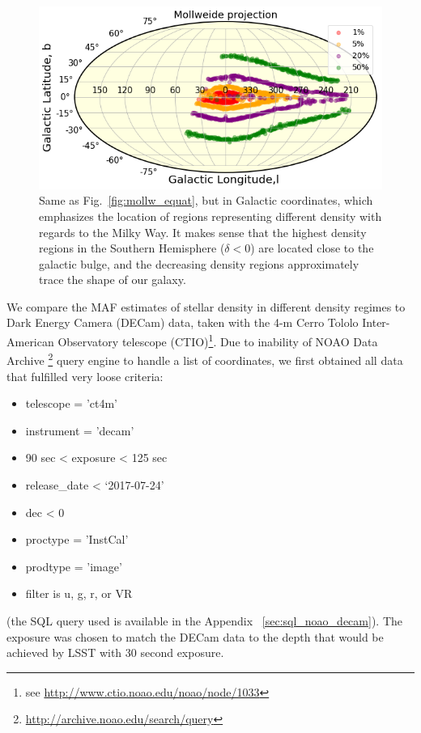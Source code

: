 \documentclass[DM,lsstdraft,toc,usenatbib]{lsstdoc}
\begin{document}
\begin{figure}
\includegraphics[width=1.0\columnwidth]{figs/Illustrate_density_regions_mollw_galactic.png}
\caption{Same as Fig.~\ref{fig:mollw_equat}, but in Galactic coordinates, which emphasizes the location of regions representing different density with regards to the Milky Way. It makes sense that the highest density regions in the Southern Hemisphere ($\delta < 0$) are located close to the galactic bulge, and the decreasing density regions approximately trace the shape of our galaxy.}
\label{fig:mollw_galactic}
\end{figure} 


We compare the MAF estimates of stellar density in different density regimes to Dark Energy Camera (DECam)  data, taken with the 4-m Cerro Tololo Inter-American Observatory telescope (CTIO)\footnote{see \url{http://www.ctio.noao.edu/noao/node/1033}}. Due to inability of NOAO Data Archive \footnote{\url{http://archive.noao.edu/search/query}} query engine to handle a list of coordinates, we  first obtained all data that fulfilled very loose criteria:
\begin{itemize}
\item telescope = 'ct4m'
\item instrument = 'decam'
\item 90 sec < exposure < 125 sec 
\item release\_date < ‘2017-07-24'
\item dec < 0 
\item proctype = 'InstCal' 
\item prodtype = 'image'
\item filter is  u, g, r,  or VR 
\end{itemize}
(the SQL query used is available in the Appendix ~\ref{sec:sql_noao_decam}). 
The exposure was chosen to match the DECam data to the depth that would be achieved by LSST with 30 second exposure.  
\end{document}
